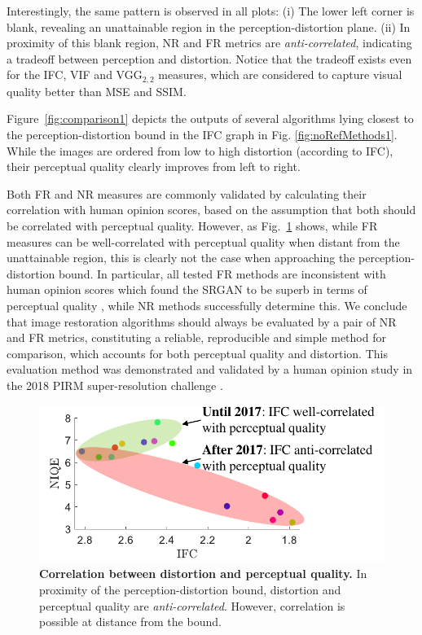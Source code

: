 Interestingly, the same pattern is observed in all plots:
(i) The lower left corner is blank, revealing an unattainable region in the perception-distortion plane. (ii) In proximity of this blank region, NR and FR metrics are \emph{anti-correlated}, indicating a tradeoff between perception and distortion. Notice that the tradeoff exists even for the IFC, VIF and VGG$_{2,2}$ measures, which are considered to capture visual quality better than MSE and SSIM.

Figure~\ref{fig:comparison1} depicts the outputs of several algorithms lying closest to the perception-distortion bound in the IFC graph in Fig. \ref{fig:noRefMethods1}. While the images are ordered from low to high distortion (according to IFC), their perceptual quality clearly improves from left to right.

Both FR and NR measures are commonly validated by calculating their correlation with human opinion scores, based on the assumption that both should be correlated with perceptual quality. However, as Fig.~\ref{fig:Ma_IFC_correlation} shows, while FR measures can be well-correlated with perceptual quality when distant from the unattainable region, this is clearly not the case when approaching the perception-distortion bound. In particular, all tested FR methods are inconsistent with human opinion scores which found the SRGAN to be superb in terms of perceptual quality \cite{ledig2016photo}, while NR methods successfully determine this. We conclude that image restoration algorithms should always be evaluated by a pair of NR and FR metrics, constituting a reliable, reproducible and simple method for comparison, which accounts for both perceptual quality and distortion. This evaluation method was demonstrated and validated by a human opinion study in the 2018 PIRM super-resolution challenge \cite{blau2018pirm}.

\begin{figure}
	\begin{center}
		\includegraphics[width=0.95\linewidth]{figures/NIQE_IFC_corr.pdf}
	\end{center}
	\caption{\textbf{Correlation between distortion and perceptual quality.} In proximity of the perception-distortion bound, distortion and perceptual quality are \emph{anti-correlated}. However, correlation is possible at distance from the bound.}
	\label{fig:Ma_IFC_correlation}
\end{figure}


